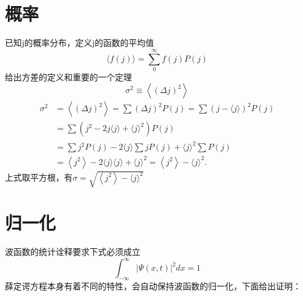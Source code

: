 	\section{概率}
		已知j的概率分布，定义j的函数的平均值
		\begin{equation}
		\langle f(j)\rangle=\sum_{0}^{\infty} f(j) P(j)
		\end{equation}
		给出方差的定义和重要的一个定理
			\begin{equation}
			\sigma^{2} \equiv\left\langle(\Delta j)^{2}\right\rangle
			\end{equation}
			\begin{equation}
			\begin{aligned}
			\sigma^{2} &=\left\langle(\Delta j)^{2}\right\rangle=\sum(\Delta j)^{2} P(j)=\sum(j-\langle j\rangle)^{2} P(j) \\
			&=\sum\left(j^{2}-2 j\langle j\rangle+\langle j\rangle^{2}\right) P(j) \\
			&=\sum j^{2} P(j)-2\langle j\rangle \sum j P(j)+\langle j\rangle^{2} \sum P(j) \\
			&=\left\langle j^{2}\right\rangle-2\langle j\rangle\langle j\rangle+\langle j\rangle^{2}=\left\langle j^{2}\right\rangle-\langle j\rangle^{2} .
			\end{aligned}
			\end{equation}
		上式取平方根，有$\sigma=\sqrt{\left\langle j^{2}\right\rangle-\langle j\rangle^{2}}$
	\section{归一化}
		波函数的统计诠释要求下式必须成立
		\begin{equation}
			\int_{-\infty}^{\infty}|\Psi(x, t)|^{2} d x=1
		\end{equation}
		薛定谔方程本身有着不同的特性，会自动保持波函数的归一化，下面给出证明：

